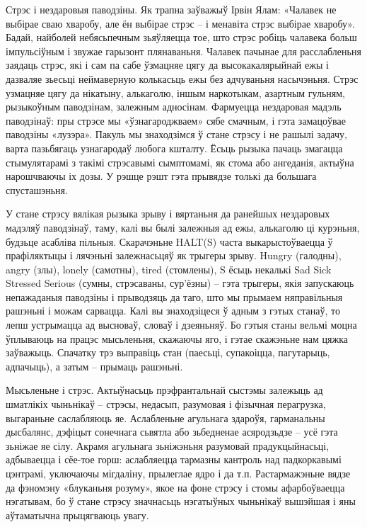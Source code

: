 Стрэс і нездаровыя паводзіны. Як трапна заўважыў Ірвін Ялам: «Чалавек не выбірае сваю хваробу, але ён выбірае стрэс – і менавіта стрэс выбірае хваробу». Бадай, найболей небясьпечным зьяўляецца тое, што стрэс робіць чалавека больш імпульсіўным і звужае гарызонт плянаваньня. Чалавек пачынае для расслабленьня заядаць стрэс, які і сам па сабе ўзмацняе цягу да высокакалярыйнай ежы і дазваляе зьесьці неймаверную колькасьць ежы без адчуваньня насычэньня. Стрэс узмацняе цягу да нікатыну, алькаголю, іншым наркотыкам, азартным гульням, рызыкоўным паводзінам, залежным адносінам. Фармуецца нездаровая мадэль паводзінаў: пры стрэсе мы «ўзнагароджваем» сябе смачным, і гэта замацоўвае паводзіны «лузэра». Пакуль мы знаходзімся ў стане стрэсу і не рашылі задачу, варта пазьбягаць узнагародаў любога кшталту. Ёсьць рызыка пачаць змагацца стымулятарамі з такімі стрэсавымі сымптомамі, як стома або ангеданія, актыўна нарошчваючы іх дозы. У рэшце рэшт гэта прывядзе толькі да большага спусташэньня. 

У стане стрэсу вялікая рызыка зрыву і вяртаньня да ранейшых нездаровых мадэляў паводзінаў, таму, калі вы былі залежныя ад ежы, алькаголю ці курэньня, будзьце асабліва пільныя. Скарачэньне HALT(S) часта выкарыстоўваецца ў прафіляктыцы і лячэньні залежнасьцяў як трыгеры зрыву. Hungry (галодны), angry (злы), lonely (самотны), tired (стомлены), S ёсьць некалькі Sad Sick Stressed Serious (сумны, стрэсаваны, сур'ёзны) – гэта трыгеры, якія запускаюць непажаданыя паводзіны і прыводзяць да таго, што мы прымаем няправільныя рашэньні і можам сарвацца. Калі вы знаходзіцеся ў адным з гэтых станаў, то лепш устрымацца ад высноваў, словаў і дзеяньняў. Бо гэтыя станы вельмі моцна ўплываюць на працэс мысьленьня, скажаючы яго, і гэтае скажэньне нам цяжка заўважыць. Спачатку трэ выправіць стан (паесьці, супакоіцца, пагутарыць, адпачыць), а затым – прымаць рашэньні.

Мысьленьне і стрэс. Актыўнасьць прэфрантальнай сыстэмы залежыць ад шматлікіх чыньнікаў – стрэсы, недасып, разумовая і фізычная перагрузка, выгараньне саслабляюць яе. Аслабленьне агульнага здароўя, гарманальны дысбалянс, дэфіцыт сонечнага сьвятла або зьбедненае асяродзьдзе – усё гэта зьніжае яе сілу. Акрамя агульнага зьніжэньня разумовай прадукцыйнасьці, адбываецца і сёе-тое горш: аслабляецца тармазны кантроль над падкоркавымі цэнтрамі, уключаючы мігдаліну, прылеглае ядро і да т.п. Растармажэньне вядзе да фэномэну «блуканьня розуму», якое на фоне стрэсу і стомы афарбоўваецца нэгатывам, бо ў стане стрэсу значнасьць нэгатыўных чыньнікаў вышэйшая і яны аўтаматычна прыцягваюць увагу.

